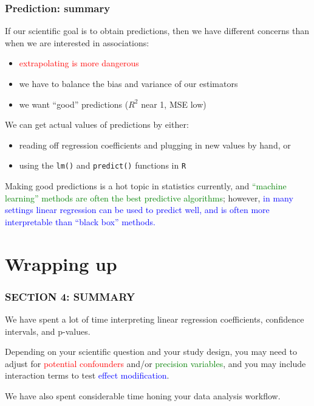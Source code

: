 \documentclass[12pt, 
hyperref={colorlinks=true, linkcolor=blue, urlcolor=cyan},dvipsnames]{beamer}
\begin{document}
\begin{frame}
\frametitle{Prediction: summary}
If our scientific goal is to obtain predictions, then we have different concerns than when we are interested in associations: \vspace{-0.3cm}
\begin{itemize}
\item \textcolor{red}{extrapolating is more dangerous}
\item we have to balance the bias and variance of our estimators
\item we want ``good'' predictions ($R^2$ near 1, MSE low)
\end{itemize}

We can get actual values of predictions by either: \vspace{-0.3cm}
\begin{itemize}
\item reading off regression coefficients and plugging in new values by hand, or
\item using the \texttt{lm()} and \texttt{predict()} functions in \texttt{R}
\end{itemize}

Making good predictions is a hot topic in statistics currently, and \textcolor{green}{``machine learning'' methods are often the best predictive algorithms}; however, \textcolor{blue}{in many settings linear regression can be used to predict well, and is often more interpretable than ``black box'' methods.}
\end{frame}

\section{Wrapping up}
\begin{frame}
\frametitle{SECTION 4: SUMMARY}

We have spent a lot of time interpreting linear regression coefficients, confidence intervals, and p-values.

Depending on your scientific question and your study design, you may need to adjust for \textcolor{red}{potential confounders} and/or \textcolor{green}{precision variables}, and you may include interaction terms to test \textcolor{blue}{effect modification}.

We have also spent considerable time honing your data analysis workflow.
\end{frame}
\end{document}
